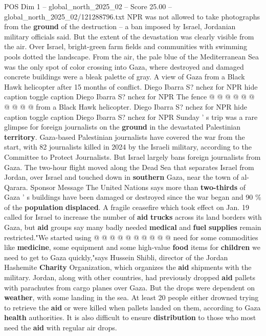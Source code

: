 \begin{textsample}{POS Dim 1 – global\_north\_2025\_02 – Score 25.00 – global\_north\_2025\_02/121288796.txt}
NPR was not allowed to take photographs from the \textbf{ground} of the destruction -- a ban imposed by Israel, Jordanian military officials said.
But the extent of the devastation was clearly visible from the air.
Over Israel, bright-green farm fields and communities with swimming pools dotted the landscape.
From the air, the pale blue of the Mediterranean Sea was the only spot of color crossing into Gaza, where destroyed and damaged concrete buildings were a bleak palette of gray.
A view of Gaza from a Black Hawk helicopter after 15 months of conflict.
Diego Ibarra S? nchez for NPR hide caption toggle caption Diego Ibarra S? nchez for NPR The fence @ @ @ @ @ @ @ @ @ @ from a Black Hawk helicopter.
Diego Ibarra S? nchez for NPR hide caption toggle caption Diego Ibarra S? nchez for NPR Sunday ' s trip was a rare glimpse for foreign journalists on the \textbf{ground} in the devastated Palestinian \textbf{territory}.
Gaza-based Palestinian journalists have covered the war from the start, with 82 journalists killed in 2024 by the Israeli military, according to the Committee to Protect Journalists.
But Israel largely bans foreign journalists from Gaza.
The two-hour flight moved along the Dead Sea that separates Israel from Jordan, over Israel and touched down in \textbf{southern} Gaza, near the town of al-Qarara.
Sponsor Message The United Nations says more than \textbf{two-thirds} of Gaza ' s buildings have been damaged or destroyed since the war began and 90 \% of the \textbf{population} \textbf{displaced}.
A fragile ceasefire which took effect on Jan. 19 called for Israel to increase the number of \textbf{aid} \textbf{trucks} across its land borders with Gaza, but \textbf{aid} groups say many badly needed \textbf{medical} and \textbf{fuel} \textbf{supplies} remain restricted."We started using @ @ @ @ @ @ @ @ @ @ need for some commodities like \textbf{medicine}, some equipment and some high-value \textbf{food} items for \textbf{children} we need to get to Gaza quickly,"says Hussein Shibli, director of the Jordan Hashemite \textbf{Charity} Organization, which organizes the \textbf{aid} shipments with the military.
Jordan, along with other countries, had previously dropped \textbf{aid} pallets with parachutes from cargo planes over Gaza.
But the drops were dependent on \textbf{weather}, with some landing in the sea.
At least 20 people either drowned trying to retrieve the \textbf{aid} or were killed when pallets landed on them, according to Gaza \textbf{health} authorities.
It is also difficult to ensure \textbf{distribution} to those who most need the \textbf{aid} with regular air drops.

\end{textsample}
